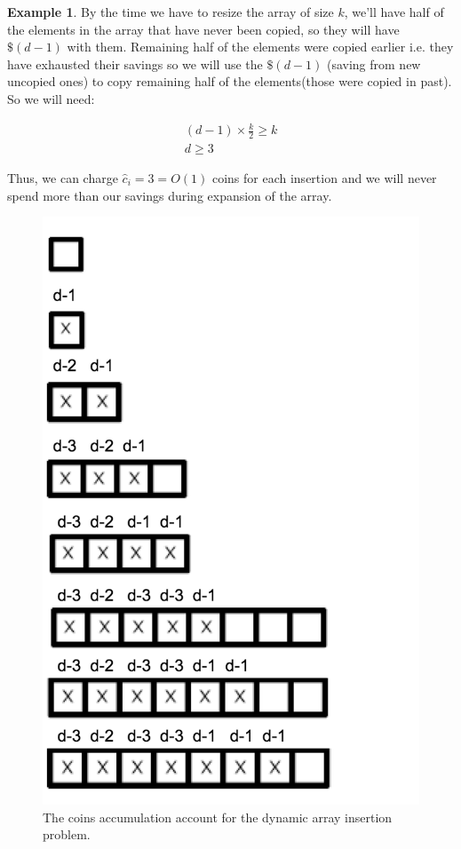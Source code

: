 \documentclass[11pt]{article}
\theoremstyle{definition}
\newtheorem{exmp}{Example}[section]
\begin{document}
\begin{exmp}
By the time we have to resize the array of size $k$, we'll have half of the elements in the array that have never been copied, so they will have $\$(d-1)$ with them. Remaining half of the elements were copied earlier i.e. they have exhausted their savings so we will use the $\$(d-1)$ (saving from new uncopied ones) to copy remaining half of the elements(those were copied in past). So we will need:

\begin{eqnarray*}
(d-1) \times \frac{k}{2} \ge k \\
d \ge 3
\end{eqnarray*}

Thus, we can charge $\hat{c}_i = 3 = O(1)$ coins for each insertion and we will never spend more than our savings during expansion of the array.

\begin{figure}[tbh]
\centering
\includegraphics[scale=0.5]{dynamicaccounting}
\caption{The coins accumulation account for the dynamic array insertion problem.}
\label{fig:dynamicaccounting}
\end{figure}
\end{exmp}
\end{document}
